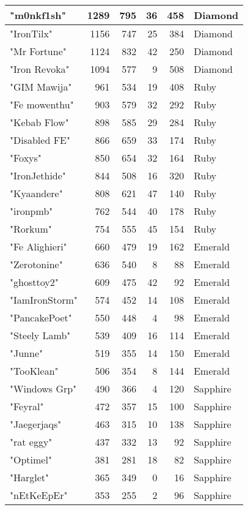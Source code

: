 \documentclass{article}
\begin{document}
\begin{table}[htbp]
\begin{tabular}{|l|r|r|r|r|l|}
"m0nkf1sh" & 1289 & 795 & 36 & 458 & Diamond \\ \hline
"IronTilx" & 1156 & 747 & 25 & 384 & Diamond \\ \hline
"Mr Fortune" & 1124 & 832 & 42 & 250 & Diamond \\ \hline
"Iron Revoka" & 1094 & 577 & 9 & 508 & Diamond \\ \hline
"GIM Mawija" & 961 & 534 & 19 & 408 & Ruby \\ \hline
"Fe mowenthu" & 903 & 579 & 32 & 292 & Ruby \\ \hline
"Kebab Flow" & 898 & 585 & 29 & 284 & Ruby \\ \hline
"Disabled FE" & 866 & 659 & 33 & 174 & Ruby \\ \hline
"Foxys" & 850 & 654 & 32 & 164 & Ruby \\ \hline
"IronJethide" & 844 & 508 & 16 & 320 & Ruby \\ \hline
"Kyaandere" & 808 & 621 & 47 & 140 & Ruby \\ \hline
"ironpmb" & 762 & 544 & 40 & 178 & Ruby \\ \hline
"Rorkum" & 754 & 555 & 45 & 154 & Ruby \\ \hline
"Fe Alighieri" & 660 & 479 & 19 & 162 & Emerald \\ \hline
"Zerotonine" & 636 & 540 & 8 & 88 & Emerald \\ \hline
"ghosttoy2" & 609 & 475 & 42 & 92 & Emerald \\ \hline
"IamIronStorm" & 574 & 452 & 14 & 108 & Emerald \\ \hline
"PancakePoet" & 550 & 448 & 4 & 98 & Emerald \\ \hline
"Steely Lamb" & 539 & 409 & 16 & 114 & Emerald \\ \hline
"Junne" & 519 & 355 & 14 & 150 & Emerald \\ \hline
"TooKlean" & 506 & 354 & 8 & 144 & Emerald \\ \hline
"Windows Grp" & 490 & 366 & 4 & 120 & Sapphire \\ \hline
"Feyral" & 472 & 357 & 15 & 100 & Sapphire \\ \hline
"Jaegerjaqs" & 463 & 315 & 10 & 138 & Sapphire \\ \hline
"rat eggy" & 437 & 332 & 13 & 92 & Sapphire \\ \hline
"Optimel" & 381 & 281 & 18 & 82 & Sapphire \\ \hline
"Harglet" & 365 & 349 & 0 & 16 & Sapphire \\ \hline
"nEtKeEpEr" & 353 & 255 & 2 & 96 & Sapphire \\ \hline

\end{tabular}
\end{table}
\end{document}
